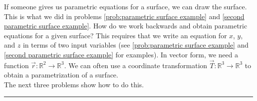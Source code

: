%

\vskip0.2in
If someone gives us parametric equations for a surface, we can draw the surface. This is what we did in problems \ref{prob:parametric surface example} and \ref{second parametric surface example}. 
How do we work backwards and obtain parametric equations for a given surface?
This requires that we write an equation for $x$, $y$, and $z$ in terms of two input variables (see \ref{prob:parametric surface example} and \ref{second parametric surface example} for examples). 
In vector form, we need a function $\vec r\colon \mathbb{R}^2\to\mathbb{R}^3$. 
We can often use a coordinate transformation $\vec T\colon \mathbb{R}^3\to\mathbb{R}^3$ to obtain a parametrization of a surface.\\
 
The next three problems show how to do this.   

\vskip0.1in
\hrule
\vskip0.1in

